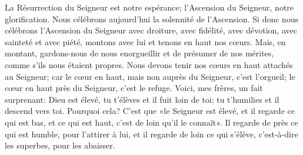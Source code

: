La Résurrection du Seigneur est notre espérance;
	l’Ascension du Seigneur, notre glorification.
	Nous célébrons aujourd’hui la solennité de l’Ascension.
Si donc nous célébrons l’Ascension du Seigneur avec droiture,
	avec fidélité, avec dévotion, avec sainteté et avec piété,
	montons avec lui et tenons en haut nos cœurs.
Mais, en montant,
	gardons-nous de nous enorgueillir et de présumer de nos mérites,
	comme s’ils nous étaient propres.
Nous devons tenir nos cœurs en haut attachés au Seigneur;
	car le cœur en haut, mais non auprès du Seigneur, c’est l’orgueil;
	le cœur en haut près du Seigneur, c’est le refuge.
Voici, mes frères, un fait surprenant:
	Dieu est élevé, tu t’élèves et il fuit loin de toi;
	tu t’humilies et il descend vers toi.
Pourquoi cela?
	C’est que «le Seigneur est élevé, et il regarde ce qui est bas,
	et ce qui est haut, c’est de loin qu’il le connaît».
Il regarde de près ce qui est humble, pour l’attirer à lui,
	et il regarde de loin ce qui s’élève, c’est-à-dire les superbes,
	pour les abaisser.
